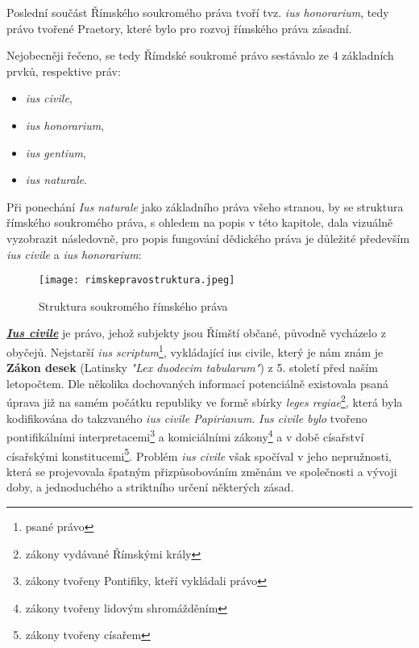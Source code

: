 \documentclass{article}
\begin{document}
Poslední součást Římského soukromého práva tvoří tvz. \textit{ius honorarium}, tedy právo tvořené Praetory, které bylo pro rozvoj římského práva zásadní. \\

\newpage

Nejobecněji řečeno, se tedy Římdské soukromé právo sestávalo ze 4 základních prvků, respektive práv:
\vspace{5 mm}

\begin{itemize}
\item \textit{ius civile},
\item \textit{ius honorarium},
\item \textit{ius gentium},
\item \textit{ius naturale}.
\end{itemize}

\vspace{5 mm}


Při ponechání \textit{Ius naturale} jako základního práva všeho stranou, by se struktura římského soukromého práva, s ohledem na popis v této kapitole, dala vizuálně vyzobrazit následovně, pro popis fungování dědického práva je důležité především \textit{ius civile} a \textit{ius honorarium}:

\begin{figure}[h]
\centering
\texttt{[image: rimskepravostruktura.jpeg]}
\caption{Struktura soukromého římského práva}
\label{fig:struktura}
\end{figure}

\underline{\textbf{\textit{Ius civile}}} je právo, jehož subjekty jsou Římští občané, původně vycházelo z obyčejů. Nejstarší \textit{ius scriptum}\footnote{psané právo}, vykládající ius civile, který je nám znám je \textbf{Zákon \MakeUppercase{} desek} (Latinsky \textit{"Lex duodecim tabularum"}) z 5. století před naším letopočtem. Dle několika dochovaných informací potenciálně existovala psaná úprava již na samém počátku republiky ve formě sbírky \textit{leges regiae}\footnote{zákony vydávané Římskými krály}, která byla kodifikována do takzvaného \textit{ius civile Papirianum}. \textit{Ius civile bylo} tvořeno pontifikálními interpretacemi\footnote{zákony tvořeny Pontifiky, kteří vykládali právo} a komiciálními zákony\footnote{zákony tvořeny lidovým shromážděním} a v době císařství císařskými konstitucemi\footnote{zákony tvořeny císařem}. Problém \textit{ius civile} však spočíval v jeho nepružnosti, která se projevovala špatným přizpůsobováním změnám ve společnosti a vývoji doby, a jednoduchého a striktního určení některých zásad. \\
\end{document}
